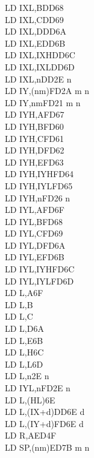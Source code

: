 \begin{multicols}{3}
{\begin{tabbing}
        LD IXL,B\UNDOC\>DD68\\
        LD IXL,C\UNDOC\>DD69\\
        LD IXL,D\UNDOC\>DD6A\\
        LD IXL,E\UNDOC\>DD6B\\
        LD IXL,IXH\UNDOC\>DD6C\\
        LD IXL,IXL\UNDOC\>DD6D\\
        LD IXL,n\UNDOC\>DD2E n\\
        LD IY,(nm)\>FD2A m n\\
        LD IY,nm\>FD21 m n\\
        LD IYH,A\UNDOC\>FD67\\
        LD IYH,B\UNDOC\>FD60\\
        LD IYH,C\UNDOC\>FD61\\
        LD IYH,D\UNDOC\>FD62\\
        LD IYH,E\UNDOC\>FD63\\
        LD IYH,IYH\UNDOC\>FD64\\
        LD IYH,IYL\UNDOC\>FD65\\
        LD IYH,n\UNDOC\>FD26 n\\
        LD IYL,A\UNDOC\>FD6F\\
        LD IYL,B\UNDOC\>FD68\\
        LD IYL,C\UNDOC\>FD69\\
        LD IYL,D\UNDOC\>FD6A\\
        LD IYL,E\UNDOC\>FD6B\\
        LD IYL,IYH\UNDOC\>FD6C\\
        LD IYL,IYL\UNDOC\>FD6D\\
        LD L,A\>6F\\
        LD L,B\\
        LD L,C\\
        LD L,D\>6A\\
        LD L,E\>6B\\
        LD L,H\>6C\\
        LD L,L\>6D\\
        LD L,n\>2E n\\
        LD IYL,n\UNDOC\>FD2E n\\
        LD L,(HL)\>6E\\
        LD L,(IX+d)\>DD6E d\\
        LD L,(IY+d)\>FD6E d\\
        LD R,A\>ED4F\\
        LD SP,(nm)\>ED7B m n\\

\end{tabbing}}
\end{multicols}
